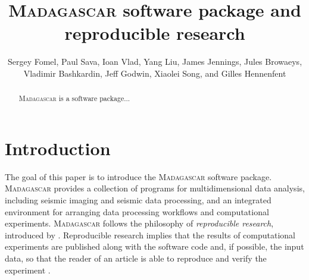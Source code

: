 \title{\textsc{Madagascar} software package and reproducible research}

\renewcommand{\thefootnote}{\fnsymbol{footnote}} 

\author{Sergey Fomel\footnotemark[1], Paul Sava\footnotemark[2], Ioan Vlad\footnotemark[3], Yang Liu\footnotemark[1], James Jennings\footnotemark[4], 
Jules Browaeys\footnotemark[5], Vladimir Bashkardin\footnotemark[1], Jeff Godwin\footnotemark[2], Xiaolei Song\footnotemark[1], and Gilles Hennenfent\footnotemark[6]}


\address{
\footnotemark[1]Bureau of Economic Geology, \\
Jackson School of Geosciences \\ The
University of Texas at Austin \\ University Station, Box X \\ Austin,
TX 78713-8924 \\
\footnotemark[2] Department of Geophysics \\
Colorado School of Mines \\
Golden, CO 80401 \\
\footnotemark[3] Statoil \\
\footnotemark[4] Shell \\
\footnotemark[5] Total \\
\footnotemark[6] Chevron}


\maketitle

\begin{abstract}
  \textsc{Madagascar} is a software package...
\end{abstract}

\section{Introduction}

The goal of this paper is to introduce the \textsc{Madagascar}
software package. \textsc{Madagascar} provides a collection of
programs for multidimensional data analysis, including seismic imaging
and seismic data processing, and an integrated environment for
arranging data processing workflows and computational
experiments. \textsc{Madagascar} follows the philosophy of
\emph{reproducible research}, introduced by \cite{SEG-1992-0601}.
Reproducible research implies that the results of computational
experiments are published along with the software code and, if
possible, the input data, so that the reader of an article is able to
reproduce and verify the experiment \cite[]{matt,intro}.

